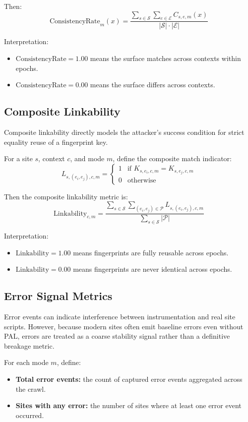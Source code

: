 \documentclass[11pt]{report}
\begin{document}
Then:
\[
\text{ConsistencyRate}_{m}(x) =
\frac{\sum_{s \in \mathcal{S}} \sum_{e \in \mathcal{E}} C_{s,e,m}(x)}
{|\mathcal{S}|\cdot|\mathcal{E}|}
\]

Interpretation:
\begin{itemize}
    \item $\text{ConsistencyRate}=1.00$ means the surface matches across contexts within epochs.
    \item $\text{ConsistencyRate}=0.00$ means the surface differs across contexts.
\end{itemize}

\subsection{Composite Linkability}

Composite linkability directly models the attacker’s success condition for strict equality reuse of a fingerprint key.

For a site $s$, context $c$, and mode $m$, define the composite match indicator:
\[
L_{s,(e_i,e_j),c,m} =
\begin{cases}
1 & \text{if } K_{s,e_i,c,m} = K_{s,e_j,c,m} \\
0 & \text{otherwise}
\end{cases}
\]

Then the composite linkability metric is:
\[
\text{Linkability}_{c,m} =
\frac{\sum_{s \in \mathcal{S}} \sum_{(e_i,e_j)\in\mathcal{P}} L_{s,(e_i,e_j),c,m}}
{\sum_{s \in \mathcal{S}} |\mathcal{P}|}
\]

Interpretation:
\begin{itemize}
    \item $\text{Linkability}=1.00$ means fingerprints are fully reusable across epochs.
    \item $\text{Linkability}=0.00$ means fingerprints are never identical across epochs.
\end{itemize}

\subsection{Error Signal Metrics}

Error events can indicate interference between instrumentation and real site scripts. However, because modern sites often emit baseline errors even without PAL, errors are treated as a coarse stability signal rather than a definitive breakage metric.

For each mode $m$, define:
\begin{itemize}
    \item \textbf{Total error events:} the count of captured error events aggregated across the crawl.
    \item \textbf{Sites with any error:} the number of sites where at least one error event occurred.
\end{itemize}
\end{document}

